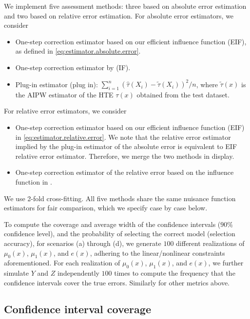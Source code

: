 \documentclass{article}
\theoremstyle{plain}
\theoremstyle{definition}
\theoremstyle{plain}
\begin{document}
We implement five assessment methods: three based on absolute error estimation and two based on relative error estimation.
For absolute error estimators, we consider
\begin{itemize}
    \item One-step correction estimator based on our efficient influence function (EIF), as defined in \eqref{eq:estimator.absolute.error}.
    \item One-step correction estimator by \cite{alaa2019validating} (IF).
    \item Plug-in estimator (plug in): $\sum_{i=1}^n (\hat{\tau}(X_i) - \tilde{\tau}(X_i))^2 / n$, where $\tilde{\tau}(x)$ is the AIPW estimator of the HTE $\tau(x)$ obtained from the test dataset.
\end{itemize}
For relative error estimators, we consider
\begin{itemize}
    \item One-step correction estimator based on our efficient influence function (EIF) in \eqref{eq:estimator.relative.error}. 
    We note that the relative error estimator implied by the plug-in estimator of the absolute error is equivalent to EIF relative error estimator.
    Therefore, we merge the two methods in display.
    
    \item One-step correction estimator of the relative error based on the influence function in \cite{alaa2019validating}.
\end{itemize}
We use 2-fold cross-fitting.
All five methods share the same nuisance function estimators for fair comparison, which we specify case by case below.


To compute the coverage and average width of the confidence intervals ($90\%$ confidence level), and the probability of selecting the correct model (selection accuracy), for scenarios (a) through (d), we generate $100$ different realizations of $\mu_0(x)$, $\mu_1(x)$, and $e(x)$, adhering to the linear/nonlinear constraints aforementioned. For each realization of $\mu_0(x)$, $\mu_1(x)$, and $e(x)$, we further simulate $Y$ and $Z$ independently $100$ times to compute the frequency that the confidence intervals cover the true errors.
Similarly for other metrics above.


\subsection{Confidence interval coverage}\label{sec:coverage}
\end{document}
